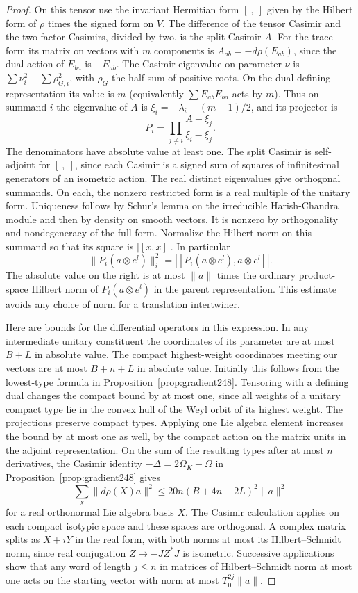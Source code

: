 \documentclass[a4paper,11pt]{article}
\theoremstyle{definition}
\theoremstyle{remark}
\numberwithin{equation}{section}
\begin{document}
\begin{proof}
On this tensor use the invariant Hermitian form \([\ ,\ ]\) given
by the Hilbert form of \(\rho\) times the signed form on \(V\).
The difference of the tensor Casimir and the two factor Casimirs,
divided by two, is the split Casimir \(A\). For the trace form its
matrix on vectors with \(m\) components is
\(A_{ab}=-d\rho(E_{ab})\), since the dual action of \(E_{ba}\) is
\(-E_{ab}\). The Casimir eigenvalue on parameter \(\nu\) is
\(\sum\nu_i^2-\sum\rho_{G,i}^2\), with \(\rho_G\) the half-sum
of positive roots. On the dual defining representation its value is
\(m\) (equivalently \(\sum E_{ab}E_{ba}\) acts by \(m\)). Thus on
summand \(i\) the eigenvalue of \(A\) is
\(\xi_i=-\lambda_i-(m-1)/2\), and its projector is
\[
       P_i=\prod_{j\ne i}\frac{A-\xi_j}{\xi_i-\xi_j} .
\]
The denominators have absolute value at least one. The split Casimir
is self-adjoint for \([\ ,\ ]\), since each Casimir is a signed sum
of squares of infinitesimal generators of an isometric action.
The real distinct eigenvalues give orthogonal summands. On each,
the nonzero restricted form is a real multiple of the unitary form.
Uniqueness follows by Schur's lemma on the irreducible Harish-Chandra
module and then by density on smooth vectors. It is nonzero by
orthogonality and nondegeneracy of the full form. Normalize the Hilbert
norm on this summand so that its square is \(|[x,x]|\). In particular
\[
 \|P_i(a\otimes e^l)\|_i^2
     = |[P_i(a\otimes e^l),a\otimes e^l]| .
\]
The absolute value on the right is at most \(\|a\|\) times the
ordinary product-space Hilbert norm of \(P_i(a\otimes e^l)\) in the
parent representation. This estimate avoids any choice of norm for a
translation intertwiner.

Here are bounds for the differential operators in this expression.
In any intermediate unitary constituent the coordinates of its parameter
are at most \(B+L\) in absolute value. The compact highest-weight
coordinates meeting our vectors are at most \(B+n+L\) in absolute
value. Initially this follows from the lowest-type formula in
Proposition~\ref{prop:gradient248}. Tensoring with a defining
dual changes the compact bound by at most one, since all weights of a
unitary compact type lie in the convex hull of the Weyl orbit of its
highest weight. The projections preserve compact types. Applying one
Lie algebra element increases the bound by at most one as well, by
the compact action on the matrix units in the adjoint representation.
On the sum of the resulting types after at most \(n\) derivatives,
the Casimir identity \(-\Delta=2\Omega_K-\Omega\) in
Proposition~\ref{prop:gradient248} gives
\[
 \sum_X\|d\rho(X)a\|^2
       \le 20n(B+4n+2L)^2\|a\|^2
\]
for a real orthonormal Lie algebra basis \(X\). The Casimir calculation
applies on each compact isotypic space and these spaces are orthogonal.
A complex matrix splits as \(X+iY\) in the real form, with both norms
at most its Hilbert--Schmidt norm, since real conjugation
\(Z\mapsto-JZ^*J\) is isometric. Successive applications show that
any word of length \(j\le n\) in matrices of Hilbert--Schmidt norm at
most one acts on the starting vector with norm at most \(T_0^{2j}\|a\|\).


\end{proof}
\end{document}
